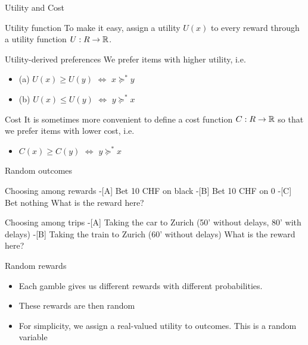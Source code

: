 \documentclass[smaller]{beamer}
\begin{document}
\begin{frame}[label={sec:org5ed0001}]{Utility and Cost}
\begin{block}{Utility function}
To make it easy, assign a utility \(U(x)\) to every reward through a
utility function \(U : R \to \mathbb{R}\).
\end{block}

\begin{block}{Utility-derived preferences}
We prefer items with higher utility, i.e.
\begin{itemize}
\item (a) \(U(x) \geq U(y)\) \(\Leftrightarrow\) \(x \succeq^* y\)
\item (b) \(U(x) \leq U(y)\) \(\Leftrightarrow\) \(y \succeq^* x\)
\end{itemize}
\end{block}

\begin{block}{Cost}
It is sometimes more convenient to define a cost function \(C: R \to \mathbb{R}\) so that we prefer items with lower cost, i.e.
\begin{itemize}
\item \(C(x) \geq C(y)\) \(\Leftrightarrow\) \(y \succeq^* x\)
\end{itemize}
\end{block}
\end{frame}

\begin{frame}[label={sec:org75afa78}]{Random outcomes}
\begin{block}{Choosing among rewards}
-[A] Bet 10 CHF on black
-[B] Bet 10 CHF on 0
-[C] Bet nothing
What is the reward here?
\end{block}

\begin{block}{Choosing among trips}
-[A] Taking the car to Zurich (50' without delays, 80' with delays)
-[B] Taking the train to Zurich (60' without delays)
What is the reward here? 
\end{block}

\begin{block}{Random rewards}
\begin{itemize}
\item Each gamble gives us different rewards with different probabilities.
\item These rewards are then \alert{random}
\item For simplicity, we assign a real-valued \alert{utility} to outcomes. This is a \alert{random variable}
\end{itemize}
\end{block}
\end{frame}
\end{document}
